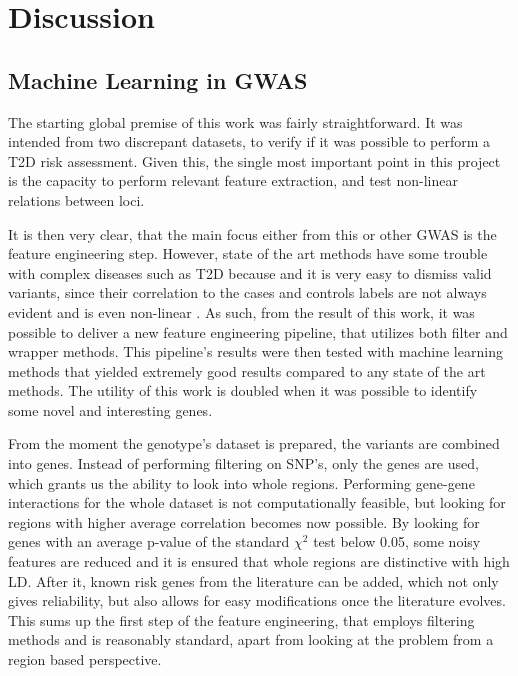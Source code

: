 
\chapter{Discussion} \label{chapter:discuss}


\section{Machine Learning in GWAS}

The starting global premise of this work was fairly straightforward. It was intended from two discrepant datasets, to verify if it was possible to perform a \gls{T2D} risk assessment. Given this, the single most important point in this project is the capacity to perform relevant feature extraction, and test non-linear relations between loci.  

It is then very clear, that the main focus either from this or other \gls{GWAS} is the feature engineering step. However, state of the art methods have some trouble with complex diseases such as \gls{T2D} because and it is very easy to dismiss valid variants, since their correlation to the cases and controls labels are not always evident and is even non-linear \cite{dorani2018feature}. As such, from the result of this work, it was possible to deliver a new feature engineering pipeline, that utilizes both filter and wrapper methods. This pipeline's results were then tested with machine learning methods that yielded extremely good results compared to any state of the art methods. The utility of this work is doubled when it was possible to identify some novel and interesting genes.

From the moment the genotype's dataset is prepared, the variants are combined into genes. Instead of performing filtering on \gls{SNP}'s, only the genes are used, which grants us the ability to look into whole regions. Performing gene-gene interactions for the whole dataset is not computationally feasible, but looking for regions with higher average correlation becomes now possible. By looking for genes with an average p-value of the standard $\chi^2$ test below 0.05, some noisy features are reduced and it is ensured that whole regions are distinctive with high \gls{LD}. After it, known risk genes from the literature can be added, which not only gives reliability, but also allows for easy modifications once the literature evolves. This sums up the first step of the feature engineering, that employs filtering methods and is reasonably standard, apart from looking at the problem from a region based perspective.

